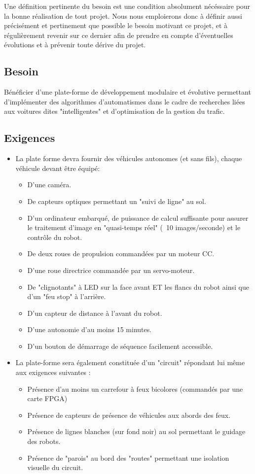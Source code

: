 Une définition pertinente du besoin est une condition absolument nécéssaire pour la bonne réalisation de tout projet. Nous nous emploierons donc à définir aussi précisément et pertinement que possible le besoin motivant ce projet, et à régulièrement revenir sur ce dernier afin de prendre en compte d'éventuelles évolutions et à prévenir toute dérive du projet.

\subsection{Besoin}
Bénéficier d'une plate-forme de développement modulaire et évolutive permettant d'implémenter des algorithmes d'automatismes dans le cadre de recherches liées aux voitures dites "intelligentes" et d’optimisation de la gestion du trafic.

\subsection{Exigences}
\begin{itemize}
	\item La plate forme devra fournir des véhicules autonomes (et sans fils), chaque véhicule devant être équipé:
	\begin{itemize}
		\item D'une caméra.
		\item De capteurs optiques permettant un "suivi de ligne" au sol.
		\item D'un ordinateur embarqué, de puissance de calcul suffisante pour assurer le traitement d'image en "quasi-temps réel" (~10 images/seconde) et le contrôle du robot.
		\item De deux roues de propulsion commandées par un moteur CC.
		\item D'une roue directrice commandée par un servo-moteur.
		\item De "clignotants" à LED sur la face avant ET les flancs du robot ainsi que d'un "feu stop" à l'arrière.
		\item D'un capteur de distance à l'avant du robot.
		\item D'une autonomie d'au moins 15 minutes.
		\item D'un bouton de démarrage de séquence facilement accessible.
	\end{itemize}
	\item La plate-forme sera également constituée d'un "circuit" répondant lui même aux exigences suivantes :
	\begin{itemize}
		\item Présence d'au moins un carrefour à feux bicolores (commandés par une carte FPGA)
		\item Présence de capteurs de présence de véhicules aux abords des feux.
		\item Présence de lignes blanches (sur fond noir) au sol permettant le guidage des robots.
		\item Présence de "parois" au bord des "routes" permettant une isolation visuelle du circuit.
	\end{itemize}
\end{itemize}